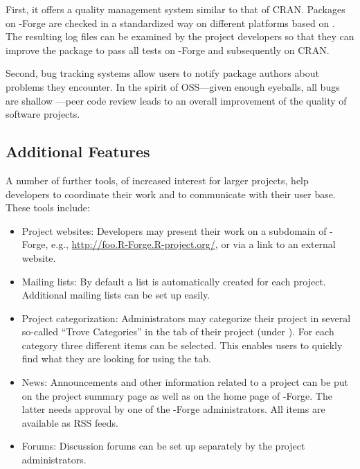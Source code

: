 First, it offers a quality management system similar to 
that of CRAN. Packages on \R{}-Forge are checked in a
standardized way on different platforms based on
. The resulting log files can be examined by the
project developers so that they can improve
the package to pass all tests on \R{}-Forge and subsequently on CRAN.

Second, bug tracking systems allow users to notify
package authors about problems they encounter. In the spirit of
OSS---given enough eyeballs, all bugs are shallow
\citep{forge:Raymond:1999}---peer code review leads to an 
overall improvement of the quality of software projects.

\subsection{Additional Features}

A number of further tools, of increased interest for larger
projects, help developers to coordinate their work and to communicate
with their user base. These tools include:

\begin{itemize}
\item Project websites: Developers may present their work
  on a subdomain of \R{}-Forge, e.g.,
  \url{http://foo.R-Forge.R-project.org/}, or via a link to an
  external website.
\item Mailing lists: By default a list
   is automatically
  created for each project. Additional mailing lists can be
  set up easily.
\item Project categorization: Administrators may categorize their
  project in several so-called ``Trove Categories'' in the 
  tab of their project (under ). For each
  category three different items can be selected. This enables users
  to quickly find what they are looking for using the 
  tab.
\item News: Announcements and other information related to a project
  can be put on the project summary page as well as on the 
  home page of \R{}-Forge. The latter needs approval by one of the \R{}-Forge
  administrators. All items are available as RSS feeds.
\item Forums: Discussion forums can be set up separately by the
  project administrators.%
\end{itemize}

